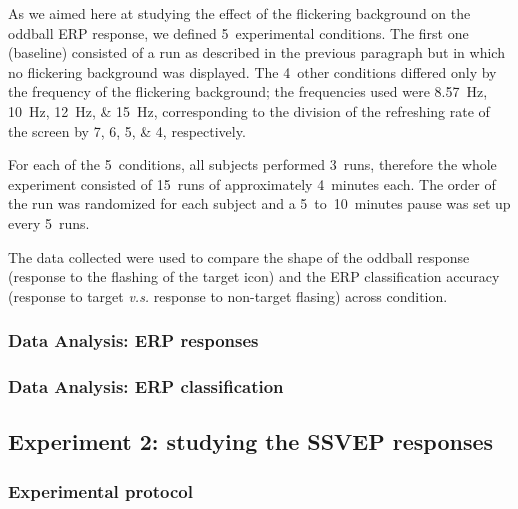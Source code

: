 \documentclass[10pt]{article}
\begin{document}
        As we aimed here at studying the effect of the flickering background on the oddball ERP response, we defined 5~experimental conditions.
        The first one (baseline) consisted of a run as described in the previous paragraph but in which no flickering background was displayed.
        The 4~other conditions differed only by the frequency of the flickering background; the frequencies used were \SIlist[list-units = single]{8.57;10;12;15}{\Hz}, corresponding to the division of the refreshing rate of the screen by \numlist{7;6;5;4}, respectively.
        
        For each of the 5~conditions, all subjects performed 3~runs, therefore the whole experiment consisted of 15~runs of approximately 4~minutes each.
        The order of the run was randomized for each subject and a 5~to~10~minutes pause was set up every 5~runs.
        
        The data collected were used to compare the shape of the oddball response (response to the flashing of the target icon) and the ERP classification accuracy (response to target \emph{v.s.} response to non-target flasing) across condition.

        \subsubsection{Data Analysis: ERP responses}
        \label{sec:2.2.2AnalysisErpShape}
        
        

        \subsubsection{Data Analysis: ERP classification}
        \label{sec:2.2.3AnalysisErpClassification}
        
        

    \subsection{Experiment 2: studying the SSVEP responses}
    \label{sec:2.3SSVEP}

        \subsubsection{Experimental protocol}
        \label{sec:2.3.1Protocol}
                
\end{document}
